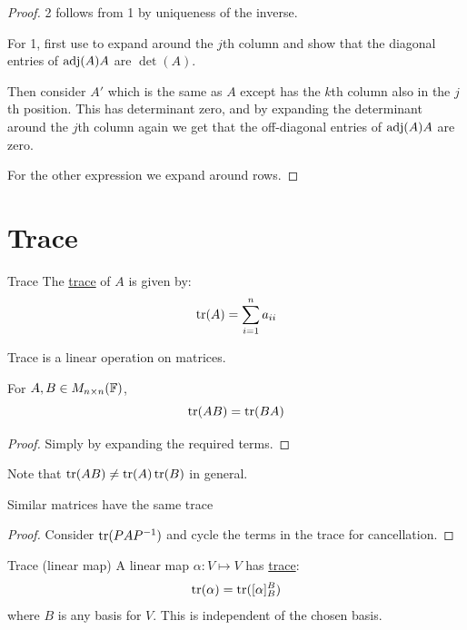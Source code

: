 \documentclass[../Main.tex]{subfiles}
\begin{document}
\begin{proof}
    2 follows from 1 by uniqueness of the inverse.

    For 1, first use  to expand around the $j$th column and show that the diagonal entries of $\operatorname{adj}(A) A$ are $\det(A)$.

    Then consider $A'$ which is the same as $A$ except has the $k$th column also in the $j$th position. This has determinant zero, and by expanding the determinant around the $j$th column again we get that the off-diagonal entries of $\operatorname{adj}(A) A$ are zero.

    For the other expression we expand around rows.
\end{proof}
\section{Trace}
\begin{definition}{Trace}
    The \underline{trace} of $A$ is given by:
    \begin{equation*}
        \operatorname{tr}(A) = \sum_{i=1}^{n} a_{ii}
    \end{equation*}
\end{definition}
Trace is a linear operation on matrices. 
\begin{proposition}
    For $A, B \in M_{n \times n}(\mathbb{F})$,
    \begin{equation*}
        \operatorname{tr}(AB) = \operatorname{tr}(BA)
    \end{equation*}
    \label{propTraceCommute}
\end{proposition}
\begin{proof}
    Simply by expanding the required terms.
\end{proof}
Note that $\operatorname{tr}(AB) \neq \operatorname{tr}(A)\operatorname{tr}(B)$ in general.
\begin{corollary}
    Similar matrices have the same trace
    \label{corTraceSimilar}
\end{corollary}
\begin{proof}
    Consider $\operatorname{tr}(PAP^{-1})$ and cycle the terms in the trace for cancellation.
\end{proof}
\begin{definition}{Trace (linear map)}
    A linear map $\alpha : V \mapsto V$ has \underline{trace}:
    \begin{equation*}
        \operatorname{tr}(\alpha) = \operatorname{tr}([\alpha]_B^B)
    \end{equation*}
    where $B$ is any basis for $V$. This is independent of the chosen basis.
\end{definition}
\end{document}
